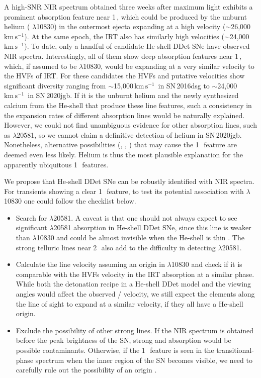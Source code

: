 \documentclass[twocolumn]{aastex631}
\newcommand{\sn}{SN\,2020jgb}
\newcommand{\kms}{$\mathrm{km}\,\mathrm{s}^{-1}$}
\begin{document}
A high-SNR NIR spectrum obtained three weeks after maximum light exhibits a prominent absorption feature near 1\,\micron, which could be produced by the unburnt helium ( $\lambda$10830) in the outermost ejecta expanding at a high velocity ($\sim$26,000\,\kms). At the same epoch, the  IRT also has similarly high velocities ($\sim$24,000\,\kms). To date, only a handful of candidate He-shell DDet SNe have observed NIR spectra. Interestingly, all of them show deep absorption features near 1\,\micron, which, if assumed to be  $\lambda$10830, would be expanding at a very similar velocity to the HVFs of  IRT. For these candidates the  HVFs and putative  velocities show significant diversity ranging from $\sim$15,000\,\kms\ in SN\,2016dsg to $\sim$24,000\,\kms\ in \sn. If it is the unburnt helium and the newly synthesized calcium from the He-shell that produce these line features, such a consistency in the expansion rates of different absorption lines would be naturally explained. However, we could not find unambiguous evidence for other  absorption lines, such as  $\lambda$20581, so we cannot claim a definitive detection of helium in \sn. Nonetheless, alternative possibilities (, , ) that may cause the 1\,\micron\ feature are deemed even less likely. Helium is thus the most plausible explanation for the apparently ubiquitous 1\,\micron\ features.

We propose that He-shell DDet SNe can be robustly identified with NIR spectra. For transients showing a clear 1\,\micron\ feature, to test its potential association with  $\lambda$10830 one could follow the checklist below.
\begin{itemize}
    \item Search for  $\lambda$20581. A caveat is that one should not always expect to see significant  $\lambda$20581 absorption in He-shell DDet SNe, since this line is weaker than  $\lambda$10830 and could be almost invisible when the He-shell is thin \citep{Boyle2017_Helium}. The strong telluric lines near 2\,\micron\ also add to the difficulty in detecting  $\lambda$20581.
    \item Calculate the line velocity assuming an origin in  $\lambda$10830 and check if it is comparable with the HVFs velocity in the  IRT absorption at a similar phase. While both the detonation recipe in a He-shell DDet model and the viewing angles would affect the observed / velocity, we still expect the elements along the line of sight to expand at a similar velocity, if they all have a He-shell origin.
    \item Exclude the possibility of other strong lines. If the NIR spectrum is obtained before the peak brightness of the SN, strong  and  absorption \citep{Hsiao_CSP_2019} would be possible contaminants. Otherwise, if the 1\,\micron\ feature is seen in the transitional-phase spectrum when the inner region of the SN becomes visible, we need to carefully rule out the possibility of an  origin \citep{Marion2009_NIR}.
\end{itemize}
\end{document}

